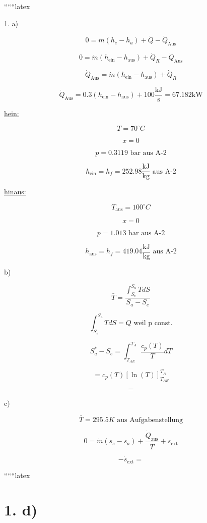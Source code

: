 
``````latex


1. a)


\[
0 = \dot{m} (h_e - h_a) + \dot{Q} - \dot{Q}_{\text{Aus}}
\]

\[
0 = \dot{m} (h_{\text{ein}} - h_{\text{aus}}) + \dot{Q}_R - \dot{Q}_{\text{Aus}}
\]

\[
\dot{Q}_{\text{Aus}} = \dot{m} (h_{\text{ein}} - h_{\text{aus}}) + \dot{Q}_R
\]

\[
\dot{Q}_{\text{Aus}} = 0.3 (h_{\text{ein}} - h_{\text{aus}}) + 100 \frac{\text{kJ}}{\text{s}} = 67.182 \text{kW}
\]

\underline{hein:}

\[
T = 70^\circ C
\]

\[
x = 0
\]

\[
p = 0.3119 \text{ bar aus A-2}
\]

\[
h_{\text{ein}} = h_f = 252.98 \frac{\text{kJ}}{\text{kg}} \text{ aus A-2}
\]

\underline{hinaus:}

\[
T_{\text{aus}} = 100^\circ C
\]

\[
x = 0
\]

\[
p = 1.013 \text{ bar aus A-2}
\]

\[
h_{\text{aus}} = h_f = 419.04 \frac{\text{kJ}}{\text{kg}} \text{ aus A-2}
\]

b)

\[
\bar{T} = \frac{\int_{S_e}^{S_a} T dS}{S_a - S_e}
\]

\[
\int_{S_e}^{S_a} T dS = Q \text{ weil p const.}
\]

\[
S_{a}^* - S_e = \int_{T_{AE}}^{T_A} \frac{c_p (T)}{T} dT
\]

\[
= c_p (T) \left[ \ln(T) \right]_{T_{AE}}^{T_A}
\]

\[
=
\]

c)

\[
\bar{T} = 295.5 K \text{ aus Aufgabenstellung}
\]

\[
0 = \dot{m} (s_e - s_a) + \frac{\dot{Q}_{\text{aus}}}{\bar{T}} + \dot{s}_{\text{ext}}
\]

\[
- \dot{s}_{\text{ext}} =
\]

``````latex


\section*{1. d)}

